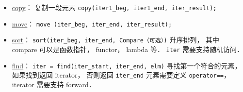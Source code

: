 
\begin{issues}
\issueDraft
\end{issues}

\begin{itemize}
\item \href{https://cplusplus.com/reference/algorithm/copy/}{copy}： 复制一段元素 \verb|copy(iter1_beg, iter1_end, iter_result);|
\item \href{https://cplusplus.com/reference/algorithm/move/}{move}： \verb|move (iter_beg, iter_end, iter_result);|
\item \href{https://cplusplus.com/reference/algorithm/sort/}{sort}： \verb|sort(iter_beg, iter_end, Compare（可选）)| 升序排列， 其中 compare 可以是函数指针， functor， lambda 等． \verb|iter| 需要支持随机访问．
\item \href{https://cplusplus.com/reference/algorithm/find/}{find}： \verb|iter = find(iter_start, iter_end, elm)| 寻找第一个符合的元素， 如果找到返回 iterator， 否则返回 \verb|iter_end| 元素需要定义 \verb|operator==|， iterator 需要支持 forward．
\end{itemize}
